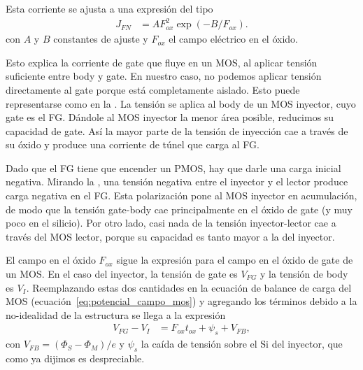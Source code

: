 Esta corriente se ajusta a una expresión del tipo
\begin{align*}
    J_{FN} &= AF_{ox}^2\exp(-B/F_{ox}).
\end{align*}
con $A$ y $B$ constantes de ajuste 
y $F_{ox}$ el campo eléctrico en el óxido.

Esto explica la corriente de gate que fluye en un MOS,
al aplicar tensión suficiente entre body y gate.
En nuestro caso, no podemos aplicar tensión directamente al gate
porque está completamente aislado.
Esto puede representarse como en la .
La tensión se aplica al body de un MOS inyector,
cuyo gate es el FG.
Dándole al MOS inyector la menor área posible, 
reducimos su capacidad de gate.
Así la mayor parte de la tensión de inyección cae a través de su óxido
y produce una corriente de túnel que carga al FG.

Dado que el FG tiene que encender un PMOS,
hay que darle una carga inicial negativa.
Mirando la ,
una tensión negativa entre el inyector y el lector
produce carga negativa en el FG.
Esta polarización pone al MOS inyector en acumulación,
de modo que la tensión gate-body cae principalmente 
en el óxido de gate (y muy poco en el silicio).
Por otro lado, casi nada de la tensión inyector-lector
cae a través del MOS lector,
porque su capacidad es tanto mayor a la del inyector.

El campo en el óxido $F_{ox}$ sigue la expresión para el campo en el óxido
de gate de un MOS.
En el caso del inyector, la tensión de gate es $V_{FG}$
y la tensión de body es $V_I$.
Reemplazando estas dos cantidades en la ecuación de balance de carga
del MOS (ecuación~\ref{eq:potencial_campo_mos})
y agregando los términos debido a la no-idealidad de la estructura
se llega a la expresión
\begin{align*}
    V_{FG}-V_I &= F_{ox}t_{ox}+\psi_s+V_{FB},
\end{align*}
con $V_{FB}=(\Phi_S-\Phi_M)/e$ 
y $\psi_s$ la caída de tensión sobre el Si del inyector,
que como ya dijimos es despreciable.
%
